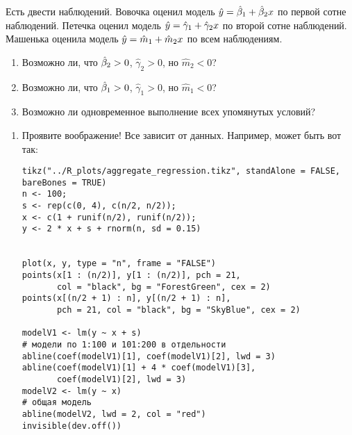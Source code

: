 \begin{problem} %
Есть двести наблюдений. Вовочка оценил модель $\hy=\hb_1+\hb_2 x$ по первой сотне наблюдений. Петечка оценил модель $\hy=\hat{\gamma}_1+\hat{\gamma}_2 x$ по второй сотне наблюдений. Машенька оценила модель $\hy=\hat{m}_1+\hat{m}_2 x$ по всем наблюдениям.
\begin{enumerate}
\item Возможно ли, что $\hb_2>0$, $\hat{\gamma}_2>0$, но $\hat{m}_2<0$?
\item Возможно ли, что $\hb_1>0$, $\hat{\gamma}_1>0$, но $\hat{m}_1<0$?
\item Возможно ли одновременное выполнение всех упомянутых условий?
\end{enumerate}


\begin{sol}
\begin{enumerate}
\item Проявите воображение! Все зависит от данных. Например, может быть вот так:

\begin{verbatim}
tikz("../R_plots/aggregate_regression.tikz", standAlone = FALSE, bareBones = TRUE)
n <- 100;
s <- rep(c(0, 4), c(n/2, n/2));
x <- c(1 + runif(n/2), runif(n/2));
y <- 2 * x + s + rnorm(n, sd = 0.15)


plot(x, y, type = "n", frame = "FALSE")
points(x[1 : (n/2)], y[1 : (n/2)], pch = 21,
       col = "black", bg = "ForestGreen", cex = 2)
points(x[(n/2 + 1) : n], y[(n/2 + 1) : n],
       pch = 21, col = "black", bg = "SkyBlue", cex = 2)

modelV1 <- lm(y ~ x + s)
# модели по 1:100 и 101:200 в отдельности
abline(coef(modelV1)[1], coef(modelV1)[2], lwd = 3)
abline(coef(modelV1)[1] + 4 * coef(modelV1)[3],
       coef(modelV1)[2], lwd = 3)
modelV2 <- lm(y ~ x)
# общая модель
abline(modelV2, lwd = 2, col = "red")
invisible(dev.off())
\end{verbatim}

\begin{minipage}{0.6\textwidth}
\begin{center}
\begin{tikzpicture}[scale = 0.025]

\end{tikzpicture}
\end{center}
\end{minipage}



\end{enumerate}
\end{sol}
\end{problem}
